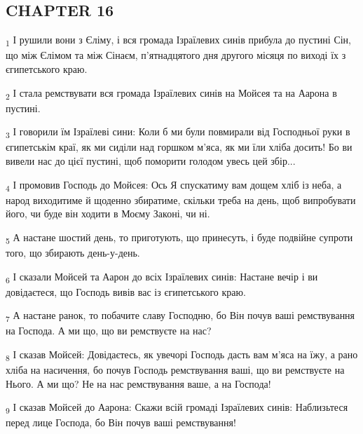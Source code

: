 \subsection{CHAPTER 16}
\begin{tcolorbox}
\textsubscript{1} І рушили вони з Єліму, і вся громада Ізраїлевих синів прибула до пустині Сін, що між Єлімом та між Сінаєм, п'ятнадцятого дня другого місяця по виході їх з єгипетського краю.
\end{tcolorbox}
\begin{tcolorbox}
\textsubscript{2} І стала ремствувати вся громада Ізраїлевих синів на Мойсея та на Аарона в пустині.
\end{tcolorbox}
\begin{tcolorbox}
\textsubscript{3} І говорили їм Ізраїлеві сини: Коли б ми були повмирали від Господньої руки в єгипетськім краї, як ми сиділи над горшком м'яса, як ми їли хліба досить! Бо ви вивели нас до цієї пустині, щоб поморити голодом увесь цей збір...
\end{tcolorbox}
\begin{tcolorbox}
\textsubscript{4} І промовив Господь до Мойсея: Ось Я спускатиму вам дощем хліб із неба, а народ виходитиме й щоденно збиратиме, скільки треба на день, щоб випробувати його, чи буде він ходити в Моєму Законі, чи ні.
\end{tcolorbox}
\begin{tcolorbox}
\textsubscript{5} А настане шостий день, то приготують, що принесуть, і буде подвійне супроти того, що збирають день-у-день.
\end{tcolorbox}
\begin{tcolorbox}
\textsubscript{6} І сказали Мойсей та Аарон до всіх Ізраїлевих синів: Настане вечір і ви довідаєтеся, що Господь вивів вас із єгипетського краю.
\end{tcolorbox}
\begin{tcolorbox}
\textsubscript{7} А настане ранок, то побачите славу Господню, бо Він почув ваші ремствування на Господа. А ми що, що ви ремствуєте на нас?
\end{tcolorbox}
\begin{tcolorbox}
\textsubscript{8} І сказав Мойсей: Довідаєтесь, як увечорі Господь дасть вам м'яса на їжу, а рано хліба на насичення, бо почув Господь ремствування ваші, що ви ремствуєте на Нього. А ми що? Не на нас ремствування ваше, а на Господа!
\end{tcolorbox}
\begin{tcolorbox}
\textsubscript{9} І сказав Мойсей до Аарона: Скажи всій громаді Ізраїлевих синів: Наблизьтеся перед лице Господа, бо Він почув ваші ремствування!
\end{tcolorbox}
